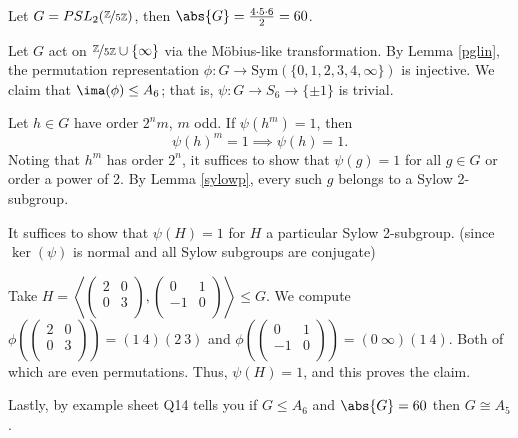 \begin{example}
    Let \(G = PSL_2(\nicefrac{\mathbb{\MakeUppercase{Z}} }{5\mathbb{\MakeUppercase{Z}} })\), then \(\abs{G} = \frac{4\cdot 5 \cdot 6}{2} = 60\).

    Let \(G\) act on \(\nicefrac{\mathbb{\MakeUppercase{Z}} }{5\mathbb{\MakeUppercase{Z}}}\cup \{\infty\}\) via the Möbius-like transformation. By Lemma \eqref{pglin}, the permutation representation \(\phi: G \to \mathrm{Sym}(\{0,1,2,3,4,\infty\})\) is injective. We claim that \(\ima(\phi)\leq A_6\); that is, \(\psi:G \to S_6\to \{\pm 1\}\) is trivial.

    Let \(h \in G\) have order \(2^n m\), \(m\) odd. If \(\psi(h^m) = 1\), then \[\psi(h)^m = 1 \implies \psi(h) = 1.\] Noting that \(h^m\) has order \(2^n\), it suffices to show that \(\psi(g) = 1\) for all \(g \in G\) or order a power of 2. By Lemma \eqref{sylowp}, every such \(g\) belongs to a Sylow 2-subgroup.

    It suffices to show that \(\psi(H) = 1\) for \(H\) a particular Sylow 2-subgroup. (since \(\ker(\psi)\) is normal and all Sylow subgroups are conjugate)

    Take \(H = \left\langle \begin{pmatrix}
        2 &  0 \\
        0 &  3 \\
    \end{pmatrix},\begin{pmatrix}
        0 &  1 \\
        -1 &  0 \\
    \end{pmatrix}\right\rangle\leq G\). We compute
    \(\phi\left(\begin{pmatrix}
        2 &  0 \\
        0 &  3 \\
    \end{pmatrix}\right)=(1~4)(2~3)\)
     and 
    \(\phi\left(\begin{pmatrix}
        0 &  1 \\
        -1 &  0 \\
    \end{pmatrix}\right)=(0~\infty)(1~4)\). Both of which are even permutations. Thus, \(\psi(H) = 1\), and this proves the claim.

    Lastly, by example sheet Q14 tells you if \(G \leq A_6\) and \(\abs{G} = 60\) then \(G \cong A_5\).
\end{example}
